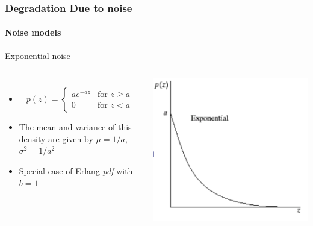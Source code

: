 \documentclass{beamer}
\begin{document}
\begin{frame}	
\frametitle{Degradation Due to noise}
\framesubtitle{Noise models}
\begin{block}{Exponential noise}
\begin{columns}
\begin{itemize}
	\item [] 
		\[
 	p(z) = 
  	\begin{cases} 
   	ae^{-az} & \text{for } z \geq a \\
   	0 & \text{for } z < a
  	\end{cases}
	\]
	\item The mean and variance of this density are given by
	$\mu = 1/a$, $\sigma^2 = 1/a^2$
	\item Special case of Erlang \textit{pdf} with $b=1$  
\end{itemize}
\includegraphics[scale=0.23]{images/L5_DR_ExpN1.png}
\end{columns}		
\end{block}
\end{frame}
\end{document}
